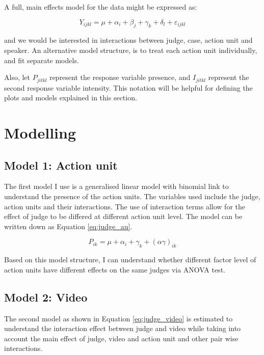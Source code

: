 \documentclass{monashthesis}
\begin{document}
A full, main effects model for the data might be expressed as:

\[Y_{ijkl} = \mu + \alpha_i + \beta_j + \gamma_k + \delta_l + \varepsilon_{ijkl}\]

\noindent and we would be interested in interactions between judge, case, action unit and speaker. An alternative model structure, is to treat each action unit individually, and fit separate models.

Also, let \(P_{jitkl}\) represent the response variable presence, and \(I_{jitkl}\) represent the second response variable intensity. This notation will be helpful for defining the plots and models explained in this section.

\hypertarget{modelling}{%
\section{Modelling}\label{modelling}}

\hypertarget{model-1-action-unit}{%
\subsection{Model 1: Action unit}\label{model-1-action-unit}}

The first model I use is a generalised linear model with binomial link to understand the presence of the action units. The variables used include the judge, action units and their interactions. The use of interaction terms allow for the effect of judge to be differed at different action unit level. The model can be written down as Equation \ref{eq:judge_au}.

\begin{equation}\label{eq:judge_au}
P_{ik} = \mu + \alpha_i + \gamma_k + (\alpha\gamma)_{ik}
\end{equation}

Based on this model structure, I can understand whether different factor level of action units have different effects on the same judges via ANOVA test.

\hypertarget{model-2-video}{%
\subsection{Model 2: Video}\label{model-2-video}}

The second model as shown in Equation \ref{eq:judge_video} is estimated to understand the interaction effect between judge and video while taking into account the main effect of judge, video and action unit and other pair wise interactions.
\end{document}
